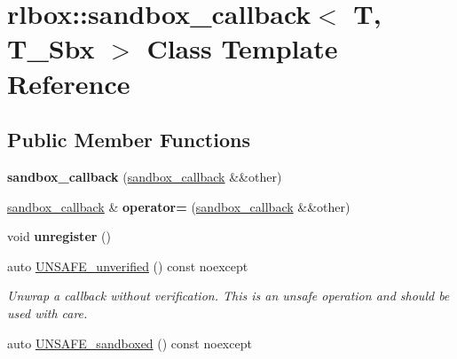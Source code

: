 \hypertarget{classrlbox_1_1sandbox__callback}{}\section{rlbox\+:\+:sandbox\+\_\+callback$<$ T, T\+\_\+\+Sbx $>$ Class Template Reference}
\label{classrlbox_1_1sandbox__callback}
\subsection*{Public Member Functions}
\begin{DoxyCompactItemize}
\item 
\mbox{\label{classrlbox_1_1sandbox__callback_af9453a813aa03d7b817b31f4ff82ce69}} 
{\bfseries sandbox\+\_\+callback} (\hyperlink{classrlbox_1_1sandbox__callback}{sandbox\+\_\+callback} \&\&other)
\item 
\mbox{\label{classrlbox_1_1sandbox__callback_ac20b4643ac1c7f887e47e80f73e81ebb}} 
\hyperlink{classrlbox_1_1sandbox__callback}{sandbox\+\_\+callback} \& {\bfseries operator=} (\hyperlink{classrlbox_1_1sandbox__callback}{sandbox\+\_\+callback} \&\&other)
\item 
\mbox{\label{classrlbox_1_1sandbox__callback_a533080e1c309f61779c132037c232c8d}} 
void {\bfseries unregister} ()
\item 
\mbox{\label{classrlbox_1_1sandbox__callback_a9d7a4e08413d3989ce8633ea459b1110}} 
auto \hyperlink{classrlbox_1_1sandbox__callback_a9d7a4e08413d3989ce8633ea459b1110}{U\+N\+S\+A\+F\+E\+\_\+unverified} () const noexcept
\begin{DoxyCompactList}\small\item\em Unwrap a callback without verification. This is an unsafe operation and should be used with care. \end{DoxyCompactList}\item 
\mbox{\label{classrlbox_1_1sandbox__callback_a6824744f81cf277e55d020f388419a47}} 
auto \hyperlink{classrlbox_1_1sandbox__callback_a6824744f81cf277e55d020f388419a47}{U\+N\+S\+A\+F\+E\+\_\+sandboxed} () const noexcept

\end{DoxyCompactItemize}
